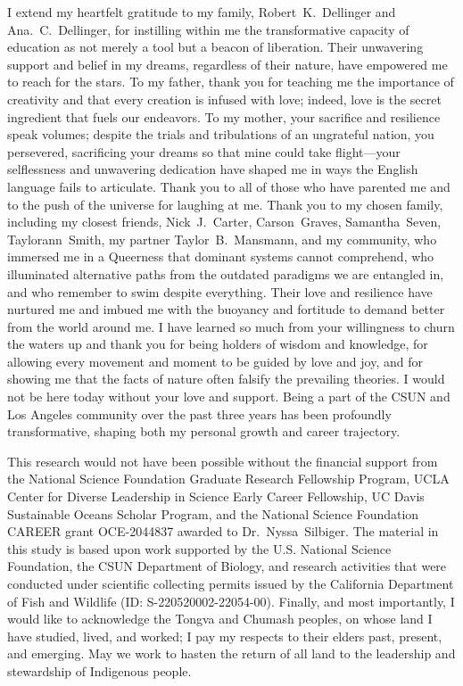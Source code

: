 \documentclass{CSUNthesis}
\begin{document}
\begin{spacing}{1.5}
  \par I extend my heartfelt gratitude to my family, Robert~K.~Dellinger and Ana.~C.~Dellinger, for instilling within me the transformative capacity of education as not merely a tool but a beacon of liberation. Their unwavering support and belief in my dreams, regardless of their nature, have empowered me to reach for the stars. To my father, thank you for teaching me the importance of creativity and that every creation is infused with love; indeed, love is the secret ingredient that fuels our endeavors. To my mother, your sacrifice and resilience speak volumes; despite the trials and tribulations of an ungrateful nation, you persevered, sacrificing your dreams so that mine could take flight—your selflessness and unwavering dedication have shaped me in ways the English language fails to articulate. Thank you to all of those who have parented me and to the push of the universe for laughing at me. Thank you to my chosen family, including my closest friends, Nick~J.~Carter, Carson~Graves, Samantha~Seven, Taylorann~Smith, my partner Taylor~B.~Mansmann, and my community, who immersed me in a Queerness that dominant systems cannot comprehend, who illuminated alternative paths from the outdated paradigms we are entangled in, and who remember to swim despite everything. Their love and resilience have nurtured me and imbued me with the buoyancy and fortitude to demand better from the world around me. I have learned so much from your willingness to churn the waters up and thank you for being holders of wisdom and knowledge, for allowing every movement and moment to be guided by love and joy, and for showing me that the facts of nature often falsify the prevailing theories. I would not be here today without your love and support. Being a part of the CSUN and Los Angeles community over the past three years has been profoundly transformative, shaping both my personal growth and career trajectory. \par This research would not have been possible without the financial support from the National Science Foundation Graduate Research Fellowship Program, UCLA Center for Diverse Leadership in Science Early Career Fellowship, UC Davis Sustainable Oceans Scholar Program, and the National Science Foundation CAREER grant OCE-2044837 awarded to Dr.~Nyssa~Silbiger. The material in this study is based upon work supported by the U.S. National Science Foundation, the CSUN Department of Biology, and research activities that were conducted under scientific collecting permits issued by the California Department of Fish and Wildlife (ID: S-220520002-22054-00). Finally, and most importantly, I would like to acknowledge the Tongva and Chumash peoples, on whose land I have studied, lived, and worked; I pay my respects to their elders past, present, and emerging. May we work to hasten the return of all land to the leadership and stewardship of Indigenous people.
\end{spacing}
\end{document}
